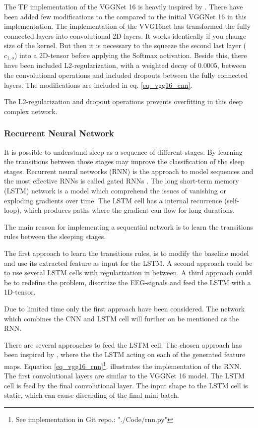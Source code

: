 The TF implementation of the VGGNet 16 is heavily inspired by \cite{git_vgg16}. There have been added few modifications to the compared to the initial VGGNet 16 \cite{VGGnet16} in this implementation. 
The implementation of the VVG16net has transformed the fully connected layers into convolutional 2D layers. It works identically if you change size of the kernel. But then it is necessary to the squeeze the second last layer ($c_{1,o}$) into a 2D-tensor before applying the Softmax activation.
Beside this, there have been included L2-regularization, with a weighted decay of $0.0005$, between the convolutional operations and included dropouts between the fully connected layers. The modifications are included in eq. \ref{eq_vgg16_cnn}.
  
 The L2-regularization and dropout operations prevents overfitting in this deep complex network. 

\subsubsection{Recurrent Neural Network}
It is possible to understand sleep as a sequence of different stages. By learning the transitions between those stages may improve the classification of the sleep stages.
Recurrent neural networks (RNN) is the approach to model sequences and the most effective RNNs is called gated RNNs \cite[sec. 10.10]{dl_book}. 
The long short-term memory (LSTM) network is a model which comprehend the issues of vanishing or exploding gradients over time. The LSTM cell has a internal recurrence (self-loop), which produces paths where the gradient can flow for long durations.  

The main reason for implementing a sequential network is to learn the transitions rules between the sleeping stages.

The first approach to learn the transitions rules, is to modify the baseline model and use its extracted feature as input for the LSTM. A second approach could be to use several LSTM cells with regularization in between. A third approach could be to redefine the problem, discritize the EEG-signals and feed the LSTM with a 1D-tensor. 

Due to limited time only the first approach have been considered. The network which combines the CNN and LSTM cell will further on be mentioned as the RNN.

There are several approaches to feed the LSTM cell. The chosen approach has been inspired by \cite{git_rnn_cnn_1,43455}, where the the LSTM acting on each of the generated feature maps.
Equation \ref{eq_vgg16_rnn}\footnote{See implementation in Git repo.: "./Code/rnn.py"}.  illustrates the implementation of the RNN. The first convolutional layers are similar to the VGGNet 16 model. The LSTM cell is feed by the final convolutional layer. The input shape to the LSTM cell is static, which can cause discarding of the final mini-batch.

